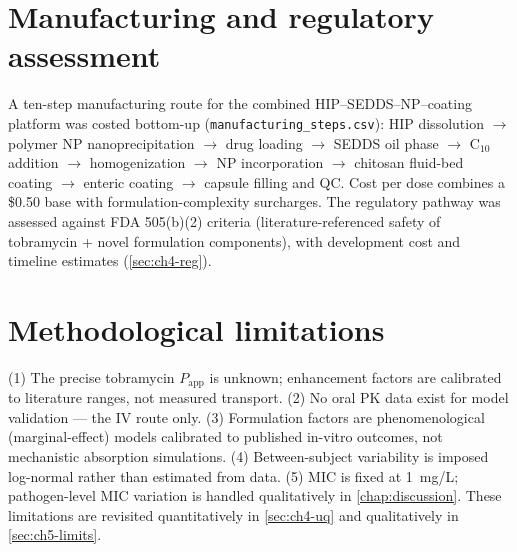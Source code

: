 \section{Manufacturing and regulatory assessment}
\label{sec:ch3-manufacturing}
A ten-step manufacturing route for the combined HIP--SEDDS--NP--coating platform was costed bottom-up (\texttt{manufacturing\_steps.csv}): HIP dissolution $\rightarrow$ polymer NP nanoprecipitation $\rightarrow$ drug loading $\rightarrow$ SEDDS oil phase $\rightarrow$ C$_{10}$ addition $\rightarrow$ homogenization $\rightarrow$ NP incorporation $\rightarrow$ chitosan fluid-bed coating $\rightarrow$ enteric coating $\rightarrow$ capsule filling and QC. Cost per dose combines a \$0.50 base with formulation-complexity surcharges. The regulatory pathway was assessed against FDA 505(b)(2) criteria (literature-referenced safety of tobramycin + novel formulation components), with development cost and timeline estimates (\cref{sec:ch4-reg}).

\section{Methodological limitations}
\label{sec:ch3-limitations}
(1) The precise tobramycin $P_{\mathrm{app}}$ is unknown; enhancement factors are calibrated to literature ranges, not measured transport. (2) No oral PK data exist for model validation --- the IV route only. (3) Formulation factors are phenomenological (marginal-effect) models calibrated to published in-vitro outcomes, not mechanistic absorption simulations. (4) Between-subject variability is imposed log-normal rather than estimated from data. (5) MIC is fixed at 1~mg/L; pathogen-level MIC variation is handled qualitatively in \cref{chap:discussion}. These limitations are revisited quantitatively in \cref{sec:ch4-uq} and qualitatively in \cref{sec:ch5-limits}.
